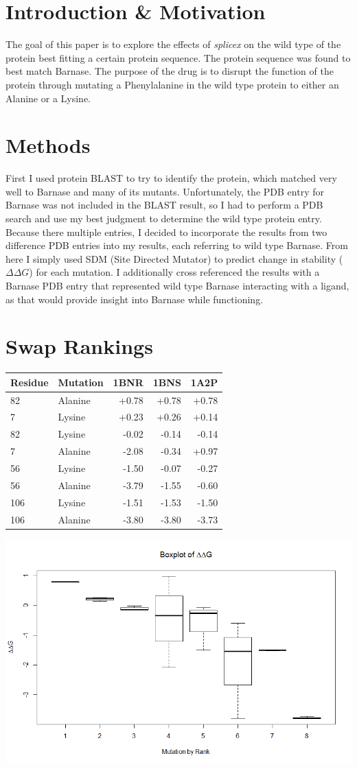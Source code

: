 \documentclass{article}
\begin{document}
\section*{Introduction \& Motivation}
The goal of this paper is to explore the effects of \textit{splicex} on the wild type of the protein best fitting a certain protein sequence. The protein sequence was found to best match Barnase. The purpose of the drug is to disrupt the function of the protein through mutating a Phenylalanine in the wild type protein to either an Alanine or a Lysine.
\section*{Methods}
First I used protein BLAST \cite{BLAST} to try to identify the protein, which matched very well to Barnase and many of its mutants. Unfortunately, the PDB entry for Barnase was not included in the BLAST result, so I had to perform a PDB search and use my best judgment to determine the wild type protein entry. Because there multiple entries, I decided to incorporate the results from two difference PDB entries into my results, each referring to wild type Barnase. From here I simply used SDM (Site Directed Mutator) \cite{SDM} to predict change in stability ($\Delta\Delta G$) for each mutation. I additionally cross referenced the results with a Barnase PDB entry that represented wild type Barnase interacting with a ligand, as that would provide insight into Barnase while functioning.
\section*{Swap Rankings}
\begin{tabular}{|l l|r|r|r|}
\hline
Residue & Mutation & 1BNR & 1BNS & 1A2P\\\hline
82 & Alanine & +0.78 &  +0.78 & +0.78 \\\hline
7 & Lysine & +0.23 & +0.26 & +0.14 \\\hline
82 & Lysine & -0.02 & -0.14 & -0.14 \\\hline
7 & Alanine & -2.08 & -0.34 & +0.97 \\\hline
56 & Lysine & -1.50 & -0.07 & -0.27 \\\hline
56 & Alanine & -3.79 & -1.55 & -0.60 \\\hline
106 & Lysine & -1.51 & -1.53 & -1.50 \\\hline
106 & Alanine & -3.80 & -3.80 & -3.73 \\\hline
\end{tabular}
\includegraphics[width=.55\textwidth]{DeltaDeltaGBoxplot.png}
\end{document}
